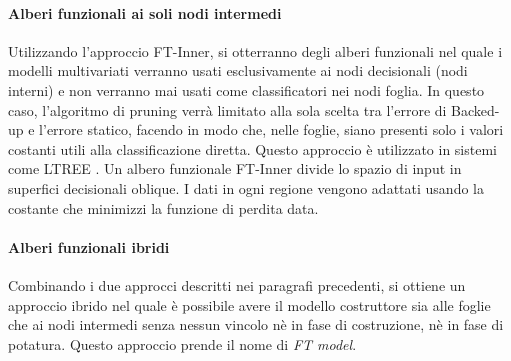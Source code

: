 \paragraph{Alberi funzionali ai soli nodi intermedi}
\label{Alberi funzionali ai soli nodi intermedi}
Utilizzando l'approccio FT-Inner, si otterranno degli alberi funzionali nel quale i modelli multivariati verranno usati esclusivamente ai nodi decisionali (nodi interni) e non verranno mai usati come classificatori nei nodi foglia. In questo caso, l'algoritmo di pruning verrà limitato alla sola scelta tra l'errore di  Backed-up e l'errore statico, facendo in modo che, nelle foglie, siano presenti solo i valori costanti utili alla classificazione diretta. Questo approccio è utilizzato in sistemi come LTREE \cite{Gama97}. Un albero funzionale FT-Inner divide lo spazio di input in superfici decisionali oblique. I dati in ogni regione vengono adattati usando la costante che minimizzi la funzione di perdita data.
\paragraph{Alberi funzionali ibridi}
\label{FT Hybrid}
Combinando i due approcci descritti nei paragrafi precedenti, si ottiene un approccio ibrido nel quale è possibile avere il modello costruttore sia alle foglie che ai nodi intermedi senza nessun vincolo nè in fase di costruzione, nè in fase di potatura. Questo approccio prende il nome di \emph{FT model}.

